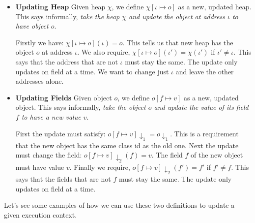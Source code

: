 \begin{itemize}   
\renewcommand{\labelitemi}{$\Box$}
\item \textbf{Updating Heap}
Given heap $\chi$, we define $\chi[\iota \mapsto o]$ as a new, updated heap.
This says informally, \textit{take the heap $\chi$ and update the 
object at address $\iota$ to have object $o$}.

Firstly we have: $\chi[\iota \mapsto o](\iota) = o$. 
This tells us that new heap has the object $o$ at address $\iota$.
We also require, $\chi[\iota \mapsto o](\iota') = \chi(\iota')$ if $\iota' \neq \iota$. 
This says that the address that are not $\iota$ must stay the same.
The update only updates on field at a time. We want to change just $\iota$ and leave 
the other addresses alone.
\item \textbf{Updating Fields} 
Given object $o$, we define $o[f \mapsto v]$ as a new, updated object.
This says informally, \textit{take the object $o$ and update the 
value of its field $f$ to have a new value $v$}.

First the update must satisfy: $o[f \mapsto v] \downarrow_1 = o \downarrow_1$. 
This is a requirement that the new object has the same class id as the old one.
Next the update must change the field: $o[f \mapsto v] \downarrow_2 (f) = v$.
The field $f$ of the new object must have value $v$. 
Finally we require, $o[f \mapsto v] \downarrow_2 (f') = f'$ if $f' \neq f$. 
This says that the fields that are not $f$ must stay the same.
The update only updates on field at a time.
\end{itemize}



Let's see some examples of how we can use these two definitions 
to update a given execution context.

\frmrule



